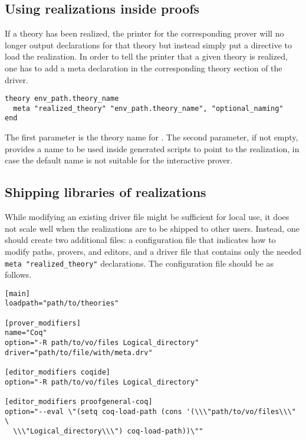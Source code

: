 \subsection{Using realizations inside proofs}

If a theory has been realized, the \why printer for the corresponding prover
will no longer output declarations for that theory but instead simply put
a directive to load the realization. In order to tell the printer
that a given theory is realized, one has to add a meta declaration in the
corresponding theory section of the driver.

\begin{verbatim}
theory env_path.theory_name
  meta "realized_theory" "env_path.theory_name", "optional_naming"
end
\end{verbatim}

The first parameter is the theory name for \why. The second
parameter, if not empty, provides a name to be used inside generated
scripts to point to the realization, in case the default name is not
suitable for the interactive prover.

\subsection{Shipping libraries of realizations}

While modifying an existing driver file might be sufficient for local
use, it does not scale well when the realizations are to be shipped to
other users. Instead, one should create two additional files: a
configuration file that indicates how to modify paths, provers, and
editors, and a driver file that contains only the needed
\verb+meta "realized_theory"+ declarations. The configuration file should be as
follows.

\begin{verbatim}
[main]
loadpath="path/to/theories"

[prover_modifiers]
name="Coq"
option="-R path/to/vo/files Logical_directory"
driver="path/to/file/with/meta.drv"

[editor_modifiers coqide]
option="-R path/to/vo/files Logical_directory"

[editor_modifiers proofgeneral-coq]
option="--eval \"(setq coq-load-path (cons '(\\\"path/to/vo/files\\\" \
  \\\"Logical_directory\\\") coq-load-path))\""
\end{verbatim}

